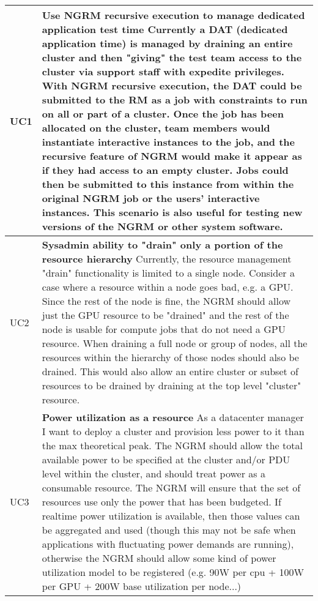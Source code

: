 \begin{longtable}{|p{1cm}|p{15cm}|}\hline
  UC1 & \textbf{Use NGRM recursive execution to manage dedicated application
	test time}\newline
	Currently a DAT (dedicated application time) is managed
	by draining an entire cluster and then "giving" the test team access
	to the cluster via support staff with expedite privileges. With
	NGRM recursive execution, the DAT could be submitted to the RM as
	a job with constraints to run on all or part of a cluster. Once the
	job has been allocated on the cluster, team members would instantiate
	interactive instances to the job, and the recursive feature of NGRM
	would make it appear as if they had access to an empty cluster. Jobs
	could then be submitted to this instance from within the original
	NGRM job or the users' interactive instances. This scenario is also
	useful for testing new versions of the NGRM or other system software.\\
  \hline
  UC2 & \textbf{Sysadmin ability to "drain" only a portion of the resource
	hierarchy}\newline
	Currently, the resource management "drain" functionality is limited
	to a single node. Consider a case where a resource within a node goes
	bad, e.g. a GPU. Since the rest of the node is fine, the NGRM should
	allow just the GPU resource to be "drained" and the rest of the
	node is usable for compute jobs that do not need a GPU resource.
	When draining a full node or group of nodes, all the resources within
	the hierarchy of those nodes should also be drained. This would also
	allow an entire cluster or subset of resources to be drained by
	draining at the top level "cluster" resource.\\
  \hline
  UC3 & \textbf{Power utilization as a resource}\newline
	As a datacenter manager I want to deploy a cluster and provision less
	power to it than the max theoretical peak. The NGRM should allow the
	total available power to be specified at the cluster and/or PDU level
	within the cluster, and should treat power as a consumable resource.
	The NGRM will ensure that the set of resources use only the power that
	has been budgeted. If realtime power utilization is available, then
	those values can be aggregated and used (though this may not be safe
	when applications with fluctuating power demands are running),
	otherwise the NGRM should allow some kind of power utilization model
	to be registered (e.g. 90W per cpu + 100W per GPU + 200W base
	utilization per node...)\\

\end{longtable}

